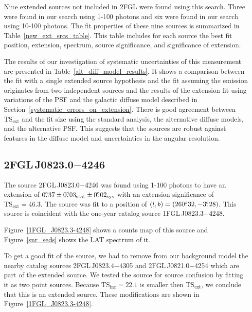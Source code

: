 \documentclass[12pt,preprint]{aastex}
\newcommand{\gev}{\text{GeV}\xspace}
\newcommand{\tsext}{{\ensuremath{\text{TS}_{\text{ext}}}}\xspace}
\newcommand{\tsinc}{\ensuremath{\text{TS}_{\text{inc}}}\xspace}
\newcommand{\sys}{\text{sys}\xspace}
\newcommand{\stat}{\text{stat}\xspace}
\newcommand{\hl}[1]{#1}
\begin{document}

Nine extended sources not included in 2FGL were found using this search.
Three were found in our search using 1-100 \gev photons and six were
found in our search using 10-100 \gev photons.  The fit properties of
these nine sources is summarized in Table~\ref{new_ext_srcs_table}.
This table includes for each source the best fit position, extension,
spectrum, source significance, and significance of extension.

The results of our investigation of systematic uncertainties of this
measurement are presented in 
Table~\ref{alt_diff_model_results}.  It
shows a comparison between the fit with a single extended source
hypothesis and the fit assuming the emission originates from two
independent sources and  the
results of the extension fit using variations of the PSF and the galactic
diffuse model described in Section~\ref{systematic_errors_on_extension}.
There is good agreement between \tsext and the fit size using
the standard analysis, the alternative diffuse models, and the alternative PSF.
This suggests that the sources are robust against features in the diffuse
model and uncertainties in the angular resolution.

\subsection{2FGL\,J0823.0$-$4246}
\label{section_2FGL_J0823.0-4246}


The source 2FGL\,J0823.0$-$4246 was found 
using 1-100 \gev photons to have an 
extension of $0\fdg37\pm0\fdg03_\stat\pm0\fdg02_\sys$ 
with an extension
significance of $\tsext=46.3$.  The source was fit to a position of
$(l,b)=(260\mbox{$.\!\!^\circ$}32,-3\mbox{$.\!\!^\circ$}28)$.  
This source is coincident with the one-year
catalog source 1FGL\,J0823.3$-$4248.
\hl{
Figure~\ref{1FGL_J0823.3-4248} shows a
counts map of this source
and Figure~\ref{snr_seds} shows the LAT spectrum of it.
}

To get a good fit of the source, we had to remove from our background
model the nearby catalog
sources 2FGL\,J0823.4$-$4305 and 2FGL\,J0821.0$-$4254 which are part of the
extended source.  We tested the source for source confusion by fitting
it as two point sources. Because $\tsinc=22.1$ is smaller then \tsext,
we conclude that this is an extended source.  These modifications are
shown in Figure~\ref{1FGL_J0823.3-4248}.
\end{document}
